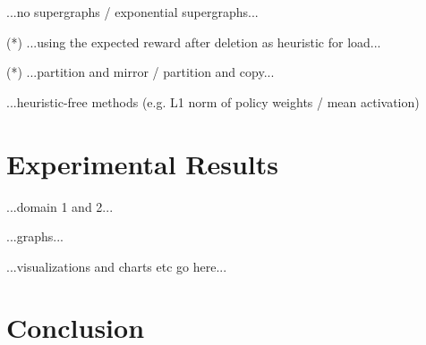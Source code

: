 \documentclass{article}
\begin{document}
...no supergraphs / exponential supergraphs...

(*) ...using the expected reward after deletion as heuristic for load...

(*) ...partition and mirror / partition and copy...

...heuristic-free methods (e.g. L1 norm of policy weights / mean activation)


\section{Experimental Results} %
\label{sec:experimental_results}

...domain 1 and 2...

...graphs...

...visualizations and charts etc go here...


\section{Conclusion} %
\label{sec:conclusion}

\end{document}
